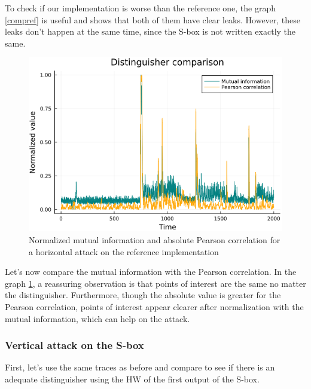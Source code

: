 \documentclass[11pt,technote]{IEEEtran}
\begin{document}
		To check if our implementation is worse than the reference one, the graph \ref{compref} is useful and shows that both of them have clear leaks. However, these leaks don't happen at the same time, since the S-box is not written exactly the same. 
		
		\begin{figure}[H]
			\centering
			\includegraphics[scale=0.4]{img_files/corr_vs_MI_hHW}
			\caption{Normalized mutual information and absolute Pearson correlation for a horizontal attack on the reference implementation}
			\label{corvsMI}
		\end{figure}
		
		Let's now compare the mutual information with the Pearson correlation. In the graph \ref{corvsMI}, a reassuring observation is that points of interest are the same no matter the distinguisher. Furthermore, though the absolute value is greater for the Pearson correlation, points of interest appear clearer after normalization with the mutual information, which can help on the attack.
		
		\subsubsection{Vertical attack on the S-box}
		First, let's use the same traces as before and compare to see if there is an adequate distinguisher using the HW of the first output of the S-box.
		
\end{document}
